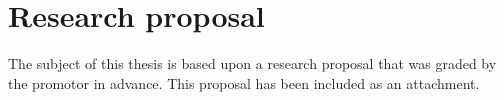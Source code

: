 \documentclass[fleqn,a4paper,12pt]{book}
\begin{document}
\appendix


\chapter{Research proposal}
\label{ch:research-proposal}

The subject of this thesis is based upon a research proposal that was graded by the promotor in advance. This proposal has been included as an attachment.



%


\printbibliography[heading=bibintoc]
\end{document}
